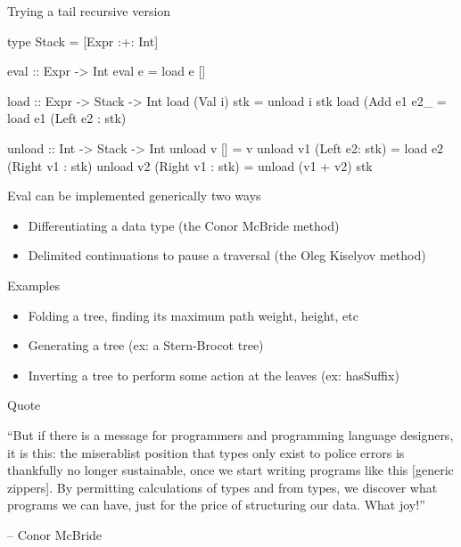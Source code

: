\documentclass[ignorenonframetext,]{beamer}
\begin{document}
\begin{frame}[fragile]{Trying a tail recursive version}

\begin{haskellcode}
type Stack = [Expr :+: Int]

eval :: Expr -> Int
eval e = load e []

load :: Expr -> Stack -> Int
load (Val i) stk = unload i stk
load (Add e1 e2_ = load e1 (Left e2 : stk)

unload :: Int -> Stack -> Int
unload v [] = v
unload v1 (Left e2: stk) = load e2 (Right v1 : stk)
unload v2 (Right v1 : stk) = unload (v1 + v2) stk
\end{haskellcode}

\end{frame}

\begin{frame}[fragile]{Eval can be implemented generically two ways}

\begin{itemize}
\itemsep1pt\parskip0pt
\item
  Differentiating a data type (the Conor McBride method)
\item
  Delimited continuations to pause a traversal (the Oleg Kiselyov
  method)
\end{itemize}

\end{frame}

\begin{frame}[fragile]{Examples}

\begin{itemize}
\itemsep1pt\parskip0pt
\item
  Folding a tree, finding its maximum path weight, height, etc
\item
  Generating a tree (ex: a Stern-Brocot tree)
\item
  Inverting a tree to perform some action at the leaves (ex: hasSuffix)
\end{itemize}

\end{frame}

\begin{frame}[fragile]{Quote}

``But if there is a message for programmers and programming language
designers, it is this: the miserablist position that types only exist to
police errors is thankfully no longer sustainable, once we start writing
programs like this {[}generic zippers{]}. By permitting calculations of
types and from types, we discover what programs we can have, just for
the price of structuring our data. What joy!''

-- Conor McBride

\end{frame}
\end{document}
